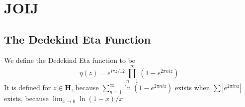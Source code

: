 \chapter{JOIJ}

\section{The Dedekind Eta Function}

We define the Dedekind Eta function to be
%
\[ \eta(z) = e^{i \pi z/12} \prod_{n = 1}^\infty (1 - e^{2 \pi n i z}) \]
%
It is defined for $z \in \mathbf{H}$, because $\sum_{n = 1}^\infty \ln (1 - e^{2 \pi n i z})$ exists when $\sum |e^{2 \pi i n z}|$ exists, because $\lim_{x \to 0} \ln(1 - x)/x$

